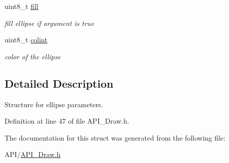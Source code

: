 \begin{DoxyCompactItemize}
\mbox{\label{struct_e_l_l_i_p_s_e_a2ffb43952012965173826ee9554c864a}} 
uint8\+\_\+t \hyperlink{struct_e_l_l_i_p_s_e_a2ffb43952012965173826ee9554c864a}{fill}
\begin{DoxyCompactList}\small\item\em fill ellipse if argument is true \end{DoxyCompactList}\item 
\mbox{\label{struct_e_l_l_i_p_s_e_a21caa4b27a71b7967f1a2d64f196a674}} 
uint8\+\_\+t \hyperlink{struct_e_l_l_i_p_s_e_a21caa4b27a71b7967f1a2d64f196a674}{colint}
\begin{DoxyCompactList}\small\item\em color of the ellipse \end{DoxyCompactList}\end{DoxyCompactItemize}


\subsection{Detailed Description}
Structure for ellipse parameters. 

Definition at line 47 of file A\+P\+I\+\_\+\+Draw.\+h.



The documentation for this struct was generated from the following file\+:\begin{DoxyCompactItemize}
\item 
A\+P\+I/\hyperlink{_a_p_i___draw_8h}{A\+P\+I\+\_\+\+Draw.\+h}\end{DoxyCompactItemize}
